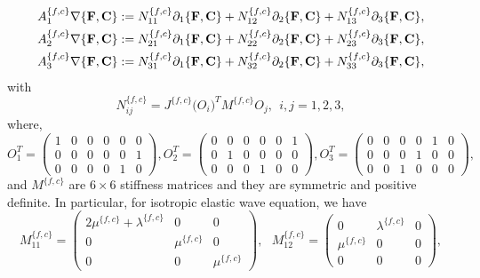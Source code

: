 \begin{align*} 
	A_1^{\{f,c\}}\nabla\{{\bf F}, {\bf C}\} &:= N_{11}^{\{f,c\}}\partial_1\{{\bf F}, {\bf C}\} + N_{12}^{\{f,c\}}\partial_2\{{\bf F}, {\bf C}\} + N_{13}^{\{f,c\}}\partial_3\{{\bf F}, {\bf C}\}, \\
	A_2^{\{f,c\}}\nabla\{{\bf F}, {\bf C}\} &:= N_{21}^{\{f,c\}}\partial_1\{{\bf F}, {\bf C}\} + N_{22}^{\{f,c\}}\partial_2\{{\bf F}, {\bf C}\} + N_{23}^{\{f,c\}}\partial_3\{{\bf F}, {\bf C}\}, \\
	A_3^{\{f,c\}}\nabla\{{\bf F}, {\bf C}\} &:= N_{31}^{\{f,c\}}\partial_1\{{\bf F}, {\bf C}\} + N_{32}^{\{f,c\}}\partial_2\{{\bf F}, {\bf C}\} + N_{33}^{\{f,c\}}\partial_3\{{\bf F}, {\bf C}\},
\end{align*}
with
\begin{equation}\label{N_definition}
	N_{ij}^{\{f,c\}} = J^{\{f,c\}}\big(O_i\big)^TM^{\{f,c\}}O_j, \ \ i,j = 1,2,3,
\end{equation}
where, 
\[ O_{1}^T = \left(\begin{array}{cccccc}
1 & 0 & 0 &0 & 0 & 0\\
0 & 0 & 0 &0 & 0 & 1\\
0 & 0 & 0 &0 & 1 & 0\end{array}\right),  O_{2}^T = \left(\begin{array}{cccccc}
0 & 0 & 0 &0 & 0 & 1\\
0 & 1 & 0 &0 & 0 & 0\\
0 & 0 & 0 &1 & 0 & 0\end{array}\right),  O_{3}^T = \left(\begin{array}{cccccc}
0 & 0 & 0 &0 & 1 & 0\\
0 & 0 & 0 &1 & 0 & 0\\
0 & 0 & 1 &0 & 0 & 0\end{array}\right),\]
and $M^{\{f,c\}}$ are $6\times 6$ stiffness matrices and they are symmetric and positive definite. In particular, for isotropic elastic wave equation, we have
\[ M_{11}^{\{f,c\}} = \left(\begin{array}{ccc}
2\mu^{\{f,c\}}+\lambda^{\{f,c\}} & 0 & 0\\
0 & \mu^{\{f,c\}} & 0\\
0 & 0 & \mu^{\{f,c\}}\end{array}\right),\ \ \  M_{12}^{\{f,c\}} = \left(\begin{array}{ccc}
0 & \lambda^{\{f,c\}} & 0\\
\mu^{\{f,c\}} & 0 & 0\\
0 & 0 & 0\end{array}\right), \]
